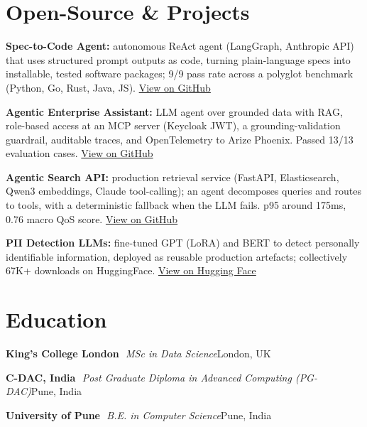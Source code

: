 \documentclass[10pt,a4paper]{article}
\newcommand{\sep}{\,\textcolor{accent!60}{\textbar}\,}
\begin{document}
\section{Open-Source \& Projects}
\begin{tight}
  \item \textbf{Spec-to-Code Agent:} autonomous ReAct agent (LangGraph, Anthropic API) that uses structured prompt outputs as code, turning plain-language specs into installable, tested software packages; 9/9 pass rate across a polyglot benchmark (Python, Go, Rust, Java, JS). \href{https://github.com/abhijeetscode/Spec-to-Code-Agent}{View on GitHub}
  \item \textbf{Agentic Enterprise Assistant:} LLM agent over grounded data with RAG, role-based access at an MCP server (Keycloak JWT), a grounding-validation guardrail, auditable traces, and OpenTelemetry to Arize Phoenix. Passed 13/13 evaluation cases. \href{https://github.com/abhijeetscode/Agentic-Enterprise-Assistant}{View on GitHub}
  \item \textbf{Agentic Search API:} production retrieval service (FastAPI, Elasticsearch, Qwen3 embeddings, Claude tool-calling); an agent decomposes queries and routes to tools, with a deterministic fallback when the LLM fails. p95 around 175ms, 0.76 macro QoS score. \href{https://github.com/abhijeetscode/search-agent}{View on GitHub}
  \item \textbf{PII Detection LLMs:} fine-tuned GPT (LoRA) and BERT to detect personally identifiable information, deployed as reusable production artefacts; collectively 67K+ downloads on HuggingFace. \href{https://huggingface.co/ab-ai/pii_model}{View on Hugging Face}
\end{tight}

\section{Education}
{\color{company}\bfseries King's College London} \sep {\itshape MSc in Data Science}\hfill {\color{muted}London, UK}\par\vspace{1pt}
{\color{company}\bfseries C-DAC, India} \sep {\itshape Post Graduate Diploma in Advanced Computing (PG-DAC)}\hfill {\color{muted}Pune, India}\par\vspace{1pt}
{\color{company}\bfseries University of Pune} \sep {\itshape B.E. in Computer Science}\hfill {\color{muted}Pune, India}\par
\end{document}

